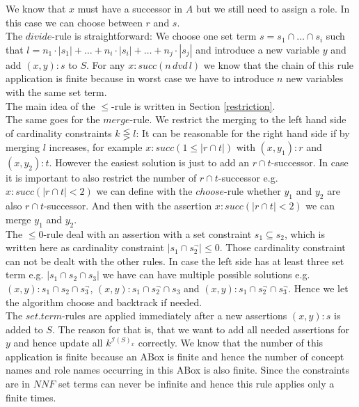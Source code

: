 \documentclass[a4paper,11pt]{scrartcl}
\theoremstyle{break}
\theoremstyle{definition}
\begin{document}
We know that $x$ must have a successor in $A$ but we still need to assign a role. In this case we can choose between $r$ and $s$.
\\
The $divide$-rule is straightforward: We choose one set term $s=s_1\cap\dots\cap s_i$ such that $l=n_1\cdot|s_1|+\dots+n_i\cdot|s_i|+\dots+n_j\cdot|s_j|$ and introduce a new variable $y$ and add $(x,y):s$ to $S$. For any $x:succ(n\,dvd\,l)$ we know that the chain of this rule application is finite because in worst case we have to introduce $n$ new variables with the same set term.
\\
The main idea of the $\leq$-rule is written in Section \ref{restriction}.\\
The same goes for the $merge$-rule. We restrict the merging to the left hand side of cardinality constraints $k\lesseqgtr l$: It can be reasonable for the right hand side if by merging $l$ increases, for example $x:succ(1\leq |r\cap t|)$ with $(x,y_1):r$ and $(x,y_2):t$. However the easiest solution is just to add an $r\cap t$-successor. In case it is important to also restrict the number of $r\cap t$-successor e.g. $x:succ(|r\cap t|<2)$ we can define with the $choose$-rule whether $y_1$ and $y_2$ are also $r\cap t$-successor. And then with the assertion $x:succ(|r\cap t|<2)$ we can merge $y_1$ and $y_2$.\\
The $\leq 0$-rule deal with an assertion with a set constraint $s_1\subseteq s_2$, which is written here as cardinality constraint $|s_1\cap s_2^\neg|\leq 0$. Those cardinality constraint can not be dealt with the other rules. In case the left side has at least three set term  e.g. $|s_1\cap s_2\cap s_3|$ we have can have multiple possible solutions e.g. $(x,y):s_1\cap s_2\cap s_3^\neg$, $(x,y):s_1\cap s_2^\neg\cap s_3$ and $(x,y):s_1\cap s_2^\neg\cap s_3^\neg$. Hence we let the algorithm choose and backtrack if needed.\\
The $set.term$-rules are applied immediately after a new assertions $(x,y):s$ is added to $S$. The reason for that is, that we want to add all needed assertions for $y$ and hence update all $k^{\mathcal{I}(S)_x}$ correctly. We know that the number of this application is finite because an ABox is finite and hence the number of concept names and role names occurring in this ABox is also finite. Since the constraints are in $NNF$ set terms can never be infinite and hence this rule applies only a finite times.
\iffalse
\end{document}
